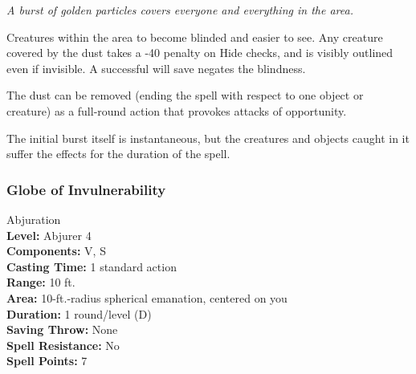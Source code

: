 \emph{A burst of golden particles covers everyone and everything in the area.} 

Creatures within the area to become blinded and easier to see. 
Any creature covered by the dust takes a -40 penalty on Hide checks, and is visibly outlined even if invisible. A successful will save negates the blindness.

The dust can be removed (ending the spell with respect to one object or creature) as a full-round action that provokes attacks of opportunity.

The initial burst itself is instantaneous, but the creatures and objects caught in it suffer the effects for the duration of the spell.

%

\subsubsection{Globe of Invulnerability}
\label{Spell:GlobeOfInvulnerability}
Abjuration
\\ \textbf{Level:} Abjurer 4
\\ \textbf{Components:} V, S
\\ \textbf{Casting Time:} 1 standard action
\\ \textbf{Range:} 10 ft.
\\ \textbf{Area:} 10-ft.-radius spherical emanation, centered on you
\\ \textbf{Duration:} 1 round/level (D)
\\ \textbf{Saving Throw:} None
\\ \textbf{Spell Resistance:} No
\\ \textbf{Spell Points:} 7


